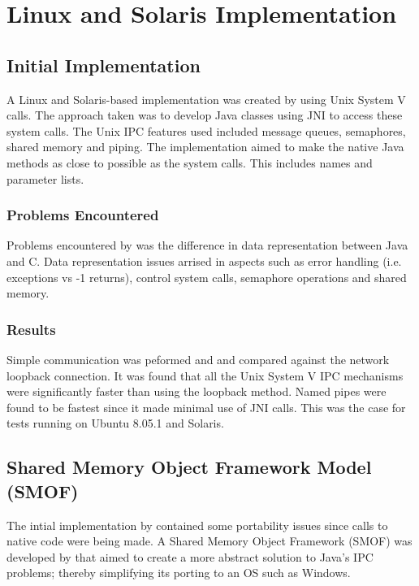 \documentclass[12pt,a4paper,oneside]{article}
\begin{document}
\section{Linux and Solaris Implementation}
\begin{spacing}{1.4}
\subsection{Initial Implementation}
A Linux and Solaris-based
implementation was created by \cite{WellsIPCMultiProc} using Unix
System V calls. The approach taken was to develop Java classes using JNI
to access these system calls. The Unix IPC features used included
message queues, semaphores, shared memory and piping. The
implementation aimed to make the native Java methods as close to
possible as the system calls. This includes names and parameter lists.

\subsubsection{Problems Encountered}
Problems encountered by \cite{WellsIPCMultiProc} was the
difference in data representation between Java and C. Data representation
issues arrised in aspects such as error handling (i.e. exceptions vs -1
returns), control system calls, semaphore operations and shared memory.

\subsubsection{Results}
Simple communication was peformed and and
compared against the network loopback connection. It was found that all
the Unix System V IPC mechanisms were significantly faster than using the
loopback method. Named pipes were found to be fastest since it made
minimal use of JNI calls. This was the case for tests running on Ubuntu
8.05.1 and Solaris.

\subsection{Shared Memory Object Framework Model (SMOF)}
The intial implementation by \cite{WellsIPCMultiProc} contained some
portability issues since calls to native code were being made. A
Shared Memory Object Framework (SMOF) was developed by \cite{WellsEfficientIPCJava} that aimed to create a more abstract solution to Java's IPC problems; thereby simplifying its porting to an OS such as Windows.


\end{spacing}
\end{document}
